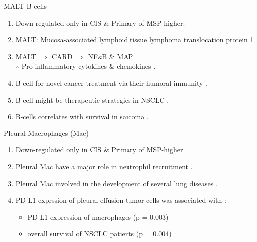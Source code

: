 \documentclass{beamer}
\begin{document}
\begin{frame}[allowframebreaks]
        \begin{block}{MALT B cells}
            \begin{enumerate}
                \item Down-regulated only in CIS \& Primary of MSP-higher.
                \item MALT: Mucosa-associated lymphoid tissue lymphoma translocation protein 1
                \item MALT $\Rightarrow$ CARD $\Rightarrow$ NF$\kappa$B \& MAP \\
                    $\therefore$ Pro-inflammatory cytokines \& chemokines \cite{MALT-1, MALT-2}.
                \item B-cell for novel cancer treatment via their humoral immunity \cite{Bcell-1}.
                \item B-cell might be therapeutic strategies in NSCLC \cite{Bcell-2}.
                \item B-cells correlates with survival in sarcoma \cite{Bcell-3}.
            \end{enumerate}
        \end{block}

        \begin{block}{Pleural Macrophages (Mac)}
            \begin{enumerate}
                \item Down-regulated only in CIS \& Primary of MSP-higher.
                \item Pleural Mac have a major role in neutrophil recruitment \cite{PleuralMac-1}.
                \item Pleural Mac involved in the development of several lung diseases \cite{PleuralMac-2}.
                \item PD-L1 exprssion of pleural effusion tumor cells was associated with \cite{PleuralMac-3}:
                    \begin{itemize}
                        \item PD-L1 expression of macrophages (p = 0.003)
                        \item overall survival of NSCLC patients (p = 0.004)
                    \end{itemize}
            \end{enumerate}
        \end{block}
    \end{frame}
\end{document}
